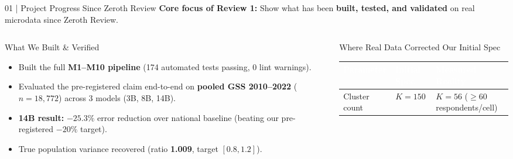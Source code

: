 \documentclass[10pt,aspectratio=169]{beamer}
\begin{document}
\begin{frame}{01 | Project Progress Since Zeroth Review}
    \small
    \textbf{Core focus of Review 1:} Show what has been \textbf{built, tested, and validated} on real microdata since Zeroth Review.

    \vspace{0.15cm}
    \begin{columns}[T]
        \begin{column}{0.48\textwidth}
            \begin{block}{What We Built \& Verified}
                \scriptsize
                \begin{itemize}\itemsep3pt
                    \item Built the full \textbf{M1--M10 pipeline} (174 automated tests passing, 0 lint warnings).
                    \item Evaluated the pre-registered claim end-to-end on \textbf{pooled GSS 2010--2022} ($n=18{,}772$) across 3 models (3B, 8B, 14B).
                    \item \textbf{14B result:} $-25.3\%$ error reduction over national baseline (beating our pre-registered $-20\%$ target).
                    \item True population variance recovered (ratio \textbf{1.009}, target $[0.8, 1.2]$).
                \end{itemize}
            \end{block}
        \end{column}
        \begin{column}{0.52\textwidth}
            \begin{block}{Where Real Data Corrected Our Initial Spec}
                \tiny
                \renewcommand{\arraystretch}{1.15}
                \begin{tabularx}{\textwidth}{@{} >{\raggedright\arraybackslash}p{2.3cm} >{\raggedright\arraybackslash}p{1.7cm} X @{}}
                    \toprule
                    \rowcolor{HeaderNavy} \textcolor{white}{\textbf{Parameter}} & \textcolor{white}{\textbf{Initial Spec}} & \textcolor{white}{\textbf{Measured Reality}} \\
                    \midrule
                    \rowcolor{RowAlt} Cluster count & $K = 150$ & \textbf{$K = 56$} ($\ge 60$ respondents/cell) \\

\end{tabularx}
\end{block}
\end{column}
\end{columns}
\end{frame}
\end{document}
